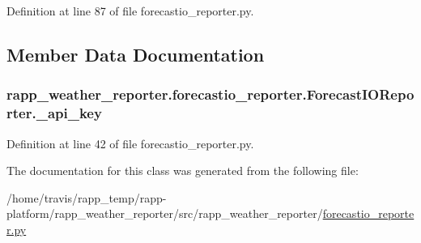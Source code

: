 Definition at line 87 of file forecastio\-\_\-reporter.\-py.



\subsection{Member Data Documentation}
\hypertarget{classrapp__weather__reporter_1_1forecastio__reporter_1_1ForecastIOReporter_a184d1c5f994656b2c90aa1af078efcf8}{
\subsubsection[{\-\_\-api\-\_\-key}]{\setlength{\rightskip}{0pt plus 5cm}rapp\-\_\-weather\-\_\-reporter.\-forecastio\-\_\-reporter.\-Forecast\-I\-O\-Reporter.\-\_\-api\-\_\-key\hspace{0.3cm}{\ttfamily [private]}}}\label{classrapp__weather__reporter_1_1forecastio__reporter_1_1ForecastIOReporter_a184d1c5f994656b2c90aa1af078efcf8}


Definition at line 42 of file forecastio\-\_\-reporter.\-py.



The documentation for this class was generated from the following file\-:\begin{DoxyCompactItemize}
\item 
/home/travis/rapp\-\_\-temp/rapp-\/platform/rapp\-\_\-weather\-\_\-reporter/src/rapp\-\_\-weather\-\_\-reporter/\hyperlink{forecastio__reporter_8py}{forecastio\-\_\-reporter.\-py}\end{DoxyCompactItemize}
